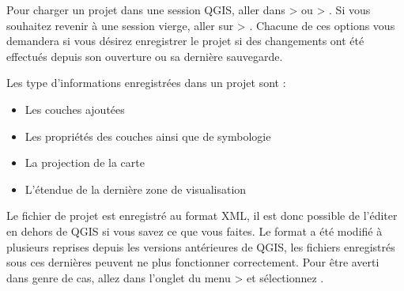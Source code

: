 Pour charger un projet dans une session QGIS, aller dans  >  ou  > . Si vous souhaitez revenir à une session vierge, aller sur  > .
Chacune de ces options vous demandera si vous désirez enregistrer le projet si des changements ont été effectués depuis son ouverture ou sa dernière sauvegarde.

Les type d'informations enregistrées dans un projet sont :

\begin{itemize}
\item Les couches ajoutées
\item Les propriétés des couches ainsi que de symbologie
\item La projection de la carte
\item L'étendue de la dernière zone de visualisation
\end{itemize}
%


Le fichier de projet est enregistré au format XML, il est donc possible de l'éditer en dehors de QGIS si vous savez ce que vous faites. Le format a été modifié à plusieurs reprises depuis les versions antérieures de QGIS, les fichiers enregistrés sous ces dernières peuvent ne plus fonctionner correctement. Pour être averti dans genre de cas, allez dans l'onglet  du menu  >  et sélectionnez .


